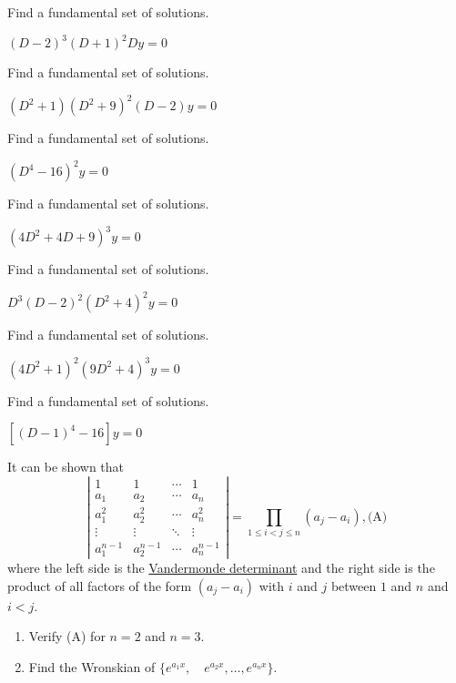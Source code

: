 \documentclass{ximera}
\begin{document}
\begin{problem}\label{exer:9.2.32}  Find a
fundamental set of solutions.

$(D-2)^3(D+1)^2Dy=0$
\end{problem}


\begin{problem}\label{exer:9.2.33}  Find a
fundamental set of solutions.

$(D^2+1)(D^2+9)^2(D-2)y=0$
\end{problem}

\begin{problem}\label{exer:9.2.34} Find a
fundamental set of solutions.

$(D^4-16)^2y=0$
\end{problem}

\begin{problem}\label{exer:9.2.35}  Find a
fundamental set of solutions.

$(4D^2+4D+9)^3y=0$
\end{problem}

\begin{problem}\label{exer:9.2.36} Find a
fundamental set of solutions.

$D^3(D-2)^2(D^2+4)^2y=0$
\end{problem}

\begin{problem}\label{exer:9.2.37}  Find a
fundamental set of solutions.

$(4D^2+1)^2(9D^2+4)^3y=0$
\end{problem}

\begin{problem}\label{exer:9.2.38} Find a
fundamental set of solutions.

$\left[(D-1)^4-16\right]y=0$
\end{problem}


\begin{problem}\label{exer:9.2.39}
It can be shown that
$$
\left|\begin{array}{cccc}
1&1&\cdots&1\\
a_1&a_2&\cdots&a_n\\
a^2_1&a^2_2&\cdots&a^2_n\\
\vdots&\vdots&\ddots&\vdots\\
a^{n-1}_1&a^{n-1}_2&\cdots&a^{n-1}_n\end{array}\right|=
\prod_{1\le i<j\le n}(a_j-a_i),
\text{(A)}
$$
where the left side is  the
\href{http://www-history.mcs.st-and.ac.uk/Mathematicians/Vandermonde.html}{Vandermonde
  determinant} and
the right side is the product of all factors of the form $(a_j-a_i)$
with $i$ and $j$ between $1$ and $n$ and $i<j$.

\begin{enumerate}
\item %
Verify  (A) for $n=2$ and $n=3$.

\item %
Find the Wronskian of $\{e^{{a_1}x}, \quad  e^{{a_2}x},\dots, e^{{a_n}x}\}$.
\end{enumerate}
\end{problem}
\end{document}
